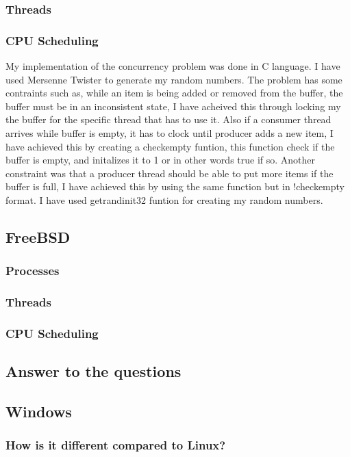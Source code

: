 \documentclass[letterpaper,10pt,draftclsnofoot,onecolumn]{IEEEtran}
\begin{document}
\subsubsection*{Threads}

\subsubsection*{CPU Scheduling}

 My implementation of the concurrency problem was done in C language. I have used Mersenne Twister to generate my random numbers. The problem has some contraints such as, while an item is being added or removed from the buffer, the buffer must be in an inconsistent state, I have acheived this through locking my the buffer for the specific thread that has to use it. Also if a consumer thread arrives while buffer is empty, it has to clock until producer adds a new item, I have achieved this by creating a checkempty funtion, this function check if the buffer is empty, and initalizes it to 1 or in other words true if so. Another constraint was that a producer thread should be able to put more items if the buffer is full, I have achieved this by using the same function but in !checkempty format. I have used getrandinit32 funtion for creating my random numbers.

\subsection*{FreeBSD}
\subsubsection*{Processes}
\subsubsection*{Threads}
\subsubsection*{CPU Scheduling}

\subsection*{Answer to the questions}
\subsection*{Windows}
\subsubsection*{How is it different compared to Linux?}
\end{document}

